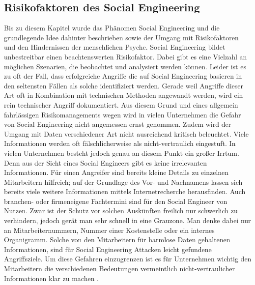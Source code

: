\subsection{Risikofaktoren des Social Engineering}\label{sec:social_engineering_als_risikofaktor}
Bis zu diesem Kapitel wurde das Phänomen Social Engineering und die grundlegende Idee dahinter
beschrieben sowie der Umgang mit Risikofaktoren und den Hindernissen der menschlichen Psyche.
Social Engineering bildet unbestreitbar einen beachtenswerten Risikofaktor.
Dabei gibt es eine Vielzahl an möglichen Szenarien, die beobachtet und analysiert werden können.
Leider ist es zu oft der Fall, dass erfolgreiche Angriffe die auf Social Engineering basieren in den
seltensten Fällen als solche identifiziert werden.
Gerade weil Angriffe dieser Art oft in Kombination mit technischen Methoden angewandt werden, wird ein
rein technischer Angriff dokumentiert.
Aus diesem Grund und eines allgemein fahrlässigen Risikomanagements wegen wird in vielen Unternehmen
die Gefahr von Social Engineering nicht angemessen ernst genommen.
Zudem wird der Umgang mit Daten verschiedener Art nicht ausreichend kritisch beleuchtet.
Viele Informationen werden oft fälschlicherweise als nicht-vertraulich eingestuft.
In vielen Unternehmen besteht jedoch genau an diesem Punkt ein großer Irrtum.
Denn aus der Sicht eines Social Engineers gibt es keine irrelevanten Informationen.
Für einen Angreifer sind bereits kleine Details zu einzelnen Mitarbeitern hilfreich; auf der Grundlage des Vor- und Nachnamens lassen sich bereits viele weitere Informationen mittels Internetrecherche herausfinden.
Auch branchen- oder firmeneigene Fachtermini sind für den Social Engineer von Nutzen.
Zwar ist der Schutz vor solchen Auskünften freilich nur schwerlich zu verhindern, jedoch gerät man sehr schnell in eine Grauzone.
Man denke dabei nur an Mitarbeiternummern, Nummer einer Kostenstelle oder ein internes Organigramm.
Solche von den Mitarbeitern für harmlose Daten gehaltenen Informationen, sind für Social Engineering Attacken leicht gefundene Angriffsziele.
Um diese Gefahren einzugrenzen ist es für Unternehmen wichtig den Mitarbeitern die verschiedenen Bedeutungen vermeintlich nicht-vertraulicher Informationen klar zu machen \citep{mitnick2006kunst}.